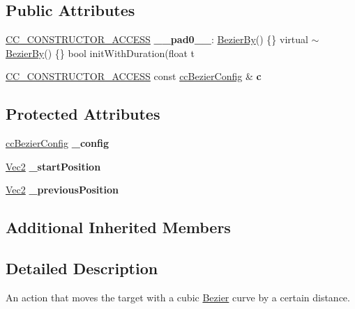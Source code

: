 \subsection*{Public Attributes}
\begin{DoxyCompactItemize}
\item 
\mbox{\label{classBezierBy_a06762b178988630dabd2715784e60d6f}} 
\hyperlink{_2cocos2d_2cocos_2base_2ccConfig_8h_a25ef1314f97c35a2ed3d029b0ead6da0}{C\+C\+\_\+\+C\+O\+N\+S\+T\+R\+U\+C\+T\+O\+R\+\_\+\+A\+C\+C\+E\+SS} {\bfseries \+\_\+\+\_\+pad0\+\_\+\+\_\+}\+: \hyperlink{classBezierBy}{Bezier\+By}() \{\} virtual $\sim$\hyperlink{classBezierBy}{Bezier\+By}() \{\} bool init\+With\+Duration(float t
\item 
\mbox{\label{classBezierBy_aac2be0d9b111b708a37a78be0e74aaf5}} 
\hyperlink{_2cocos2d_2cocos_2base_2ccConfig_8h_a25ef1314f97c35a2ed3d029b0ead6da0}{C\+C\+\_\+\+C\+O\+N\+S\+T\+R\+U\+C\+T\+O\+R\+\_\+\+A\+C\+C\+E\+SS} const \hyperlink{struct__ccBezierConfig}{cc\+Bezier\+Config} \& {\bfseries c}
\end{DoxyCompactItemize}
\subsection*{Protected Attributes}
\begin{DoxyCompactItemize}
\item 
\mbox{\label{classBezierBy_ac20875c694b0f4498edd829cc9c67581}} 
\hyperlink{struct__ccBezierConfig}{cc\+Bezier\+Config} {\bfseries \+\_\+config}
\item 
\mbox{\label{classBezierBy_a35347b965ee44152ba9df668bbf311c6}} 
\hyperlink{classVec2}{Vec2} {\bfseries \+\_\+start\+Position}
\item 
\mbox{\label{classBezierBy_a7de799382fb76dee18f85d1e0beec46e}} 
\hyperlink{classVec2}{Vec2} {\bfseries \+\_\+previous\+Position}
\end{DoxyCompactItemize}
\subsection*{Additional Inherited Members}


\subsection{Detailed Description}
An action that moves the target with a cubic \hyperlink{structBezier}{Bezier} curve by a certain distance. 

